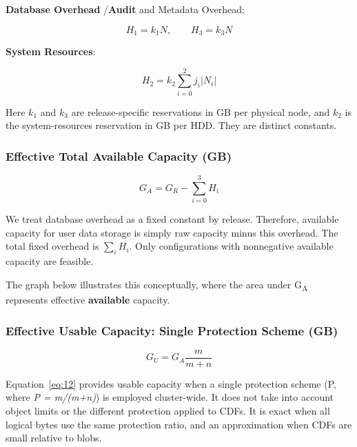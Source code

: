 \textbf{Database Overhead} /\textbf{Audit} and Metadata Overhead:


\nopagebreak
\begin{equation}\label{eq:9}
H_1=k_1N,\qquad H_3=k_3N
\end{equation}


\textbf{System Resources}:


\nopagebreak
\begin{equation}\label{eq:10}
H_2=k_2\sum_{i=0}^{2}j_i\lvert N_i\rvert
\end{equation}


Here \(k_1\) and \(k_3\) are release-specific reservations in GB per physical node, and \(k_2\) is the system-resources reservation in GB per HDD. They are distinct constants.

\subsubsection*{Effective Total Available Capacity (GB)}


\nopagebreak
\begin{equation}\label{eq:11}
G_A=G_R-\sum_{i=0}^{3}H_i
\end{equation}


We treat database overhead as a fixed constant by release. Therefore, available capacity for user data storage is simply raw capacity minus this overhead. The total fixed overhead is \(\sum_i H_i\). Only configurations with nonnegative available capacity are feasible.


The graph below illustrates this conceptually, where the area under G\textsubscript{A} represents effective \textbf{available} capacity.

\begin{center}
\resizebox{.65\linewidth}{!}{}
\end{center}


\subsubsection*{Effective Usable Capacity: Single Protection Scheme (GB)}


\nopagebreak
\begin{equation}\label{eq:12}
G_U=G_A\frac{m}{m+n}
\end{equation}
 

Equation~\eqref{eq:12} provides usable capacity when a single protection scheme (P, where \emph{P = m/(m+n)}) is employed cluster-wide. It does not take into account object limits or the different protection applied to CDFs. It is exact when all logical bytes use the same protection ratio, and an approximation when CDFs are small relative to blobs.


